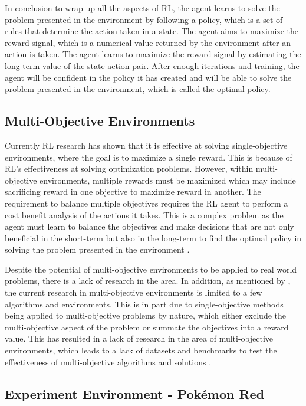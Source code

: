 In conclusion to wrap up all the aspects of RL, the agent learns to solve the problem presented in the environment by following a policy, which is a set of rules that determine the action taken in a state. The agent aims to maximize the reward signal, which is a numerical value returned by the environment after an action is taken. The agent learns to maximize the reward signal by estimating the long-term value of the state-action pair. After enough iterations and training, the agent will be confident in the policy it has created and will be able to solve the problem presented in the environment, which is called the optimal policy.

\subsection{Multi-Objective Environments}

Currently RL research has shown that it is effective at solving single-objective environments, where the goal is to maximize a single reward. This is because of RL's effectiveness at solving optimization problems. However, within multi-objective environments, multiple rewards must be maximized which may include sacrificing reward in one objective to maximize reward in another. The requirement to balance multiple objectives requires the RL agent to perform a cost benefit analysis of the actions it takes. This is a complex problem as the agent must learn to balance the objectives and make decisions that are not only beneficial in the short-term but also in the long-term to find the optimal policy in solving the problem presented in the environment \cite{hayes2022practical}. 

Despite the potential of multi-objective environments to be applied to real world problems, there is a lack of research in the area. In addition, as mentioned by \cite{hayes2022practical}, the current research in multi-objective environments is limited to a few algorithms and environments. This is in part due to single-objective methods being applied to multi-objective problems by nature, which either exclude the multi-objective aspect of the problem or summate the objectives into a reward value. This has resulted in a lack of research in the area of multi-objective environments, which leads to a lack of datasets and benchmarks to test the effectiveness of multi-objective algorithms and solutions \cite{hayes2022practical}.

\subsection{Experiment Environment - Pokémon Red}

